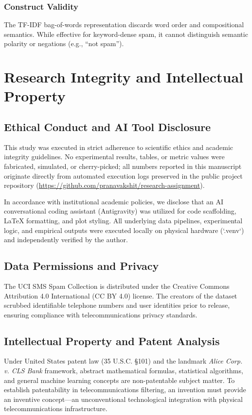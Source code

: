 \documentclass[conference]{IEEEtran}
\begin{document}
\subsubsection{Construct Validity}
The TF-IDF bag-of-words representation discards word order and compositional semantics. While effective for keyword-dense spam, it cannot distinguish semantic polarity or negations (e.g., ``not spam'').

\section{Research Integrity and Intellectual Property}

\subsection{Ethical Conduct and AI Tool Disclosure}
This study was executed in strict adherence to scientific ethics and academic integrity guidelines. No experimental results, tables, or metric values were fabricated, simulated, or cherry-picked; all numbers reported in this manuscript originate directly from automated execution logs preserved in the public project repository (\url{https://github.com/pranavakshit/research-assignment}). 

In accordance with institutional academic policies, we disclose that an AI conversational coding assistant (Antigravity) was utilized for code scaffolding, LaTeX formatting, and plot styling. All underlying data pipelines, experimental logic, and empirical outputs were executed locally on physical hardware (`.venv`) and independently verified by the author.

\subsection{Data Permissions and Privacy}
The UCI SMS Spam Collection is distributed under the Creative Commons Attribution 4.0 International (CC BY 4.0) license. The creators of the dataset scrubbed identifiable telephone numbers and user identities prior to release, ensuring compliance with telecommunications privacy standards.

\subsection{Intellectual Property and Patent Analysis}
Under United States patent law (35 U.S.C. \S 101) and the landmark \textit{Alice Corp. v. CLS Bank} framework, abstract mathematical formulas, statistical algorithms, and general machine learning concepts are non-patentable subject matter. To establish patentability in telecommunications filtering, an invention must provide an inventive concept---an unconventional technological integration with physical telecommunications infrastructure.
\end{document}
